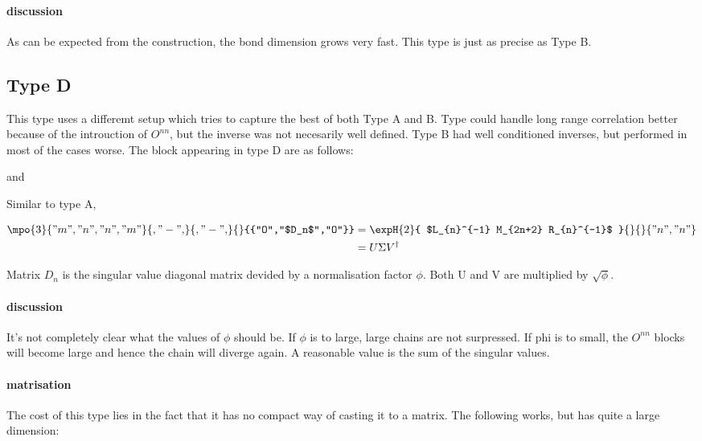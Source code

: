 \paragraph{discussion}
As can be expected from the construction, the bond dimension grows very fast. This type is just as precise as Type B.

\subsection{Type D}

This type uses a differemt setup which tries to capture the best of both Type A and B. Type  could handle long range correlation better because of the introuction of $O^{n n}$, but the inverse was not necesarily well defined. Type B had well conditioned inverses, but performed in most of the cases worse. The block appearing in type D are as follows:

 and 

Similar to type A,

\def \rhs{\expH{2}{ $L_{n}^{-1}  M_{2n+2}  R_{n}^{-1}$ }{}{}{{"n","n"}}  }
\begin{equation}
    \begin{split}
        \mpo{3}{{"m","n","n","m"}}{{,"-",}}{{,"-",}}{}{{"O","$D_n$","O"}} &= \rhs \\
        &= U \Sigma V^{ \dagger}
    \end{split}
    \label{eq_nmn_level}
\end{equation}

Matrix $D_n$ is the singular value diagonal matrix devided by a normalisation factor $\phi$. Both U and V are multiplied by $  \sqrt{\phi} $.

\paragraph{discussion}
It's not completely clear what the values of $\phi$ should be.  If $\phi$ is to large, large chains are not surpressed. If phi is to small, the $O^{n n}$ blocks will become large and hence the chain will diverge again. A reasonable value is the sum of the singular values. 

\paragraph{matrisation}
The cost of this type lies in the fact that it has no compact way of casting it to a matrix. The following works, but has quite a large dimension:

